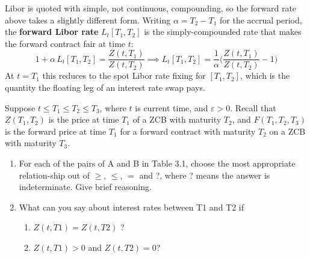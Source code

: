 \documentclass{article}
\begin{document}
    \begin{example}
      \label{ex:forward-libor-rate}
      Libor is quoted with simple, not continuous, compounding, so the forward rate above takes a slightly different form. Writing $\alpha = T_2 - T_1$ for the accrual period, the \textbf{forward Libor rate} $L_t [T_1, T_2]$ is the simply-compounded rate that makes the forward contract fair at time $t$:
      \begin{equation}
        1 + \alpha \, L_t[T_1, T_2] = \frac{Z(t, T_1)}{Z(t, T_2)} \implies L_t [T_1, T_2] = \frac{1}{\alpha} \bigg( \frac{Z(t, T_1)}{Z(t, T_2)} - 1 \bigg)
      \end{equation}
      At $t = T_1$ this reduces to the spot Libor rate fixing for $[T_1, T_2]$, which is the quantity the floating leg of an interest rate swap pays. 
    \end{example}

    \begin{exercise}[Blyth 3.1]
      Suppose $t \leq T_1 \leq T_2 \leq T_3$, where $t$ is current time, and $\varepsilon > 0$. Recall that $Z(T_1, T_2)$ is the price at time $T_1$ of a ZCB with maturity $T_2$, and $F(T_1, T_2, T_3)$ is the forward price at time $T_1$ for a forward contract with maturity $T_2$ on a ZCB with maturity $T_3$.
      \begin{enumerate}
        \item For each of the pairs of A and B in Table 3.1, choose the most appropriate relation-ship out of $\geq$, $\leq$, $=$ and ?, where ? means the answer is indeterminate. Give brief reasoning.
        \item What can you say about interest rates between T1 and T2 if 
          \begin{enumerate}
            \item $Z(t,T1) = Z(t,T2)$ ?
            \item $Z(t,T1) > 0$ and $Z(t,T2) = 0$?
          \end{enumerate}
      \end{enumerate}
    \end{exercise}
\end{document}
